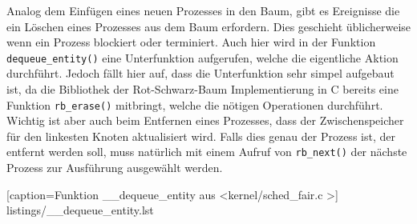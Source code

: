 Analog dem Einfügen eines neuen Prozesses in den Baum, gibt es Ereignisse die ein Löschen eines Prozesses aus dem Baum erfordern. Dies geschieht üblicherweise wenn ein Prozess blockiert oder terminiert. Auch hier wird in der Funktion \texttt{dequeue\_entity()} eine Unterfunktion aufgerufen, welche die eigentliche Aktion durchführt. Jedoch fällt hier auf, dass die Unterfunktion sehr simpel aufgebaut ist, da die Bibliothek der Rot-Schwarz-Baum Implementierung in C bereits eine Funktion \texttt{rb\_erase()} mitbringt, welche die nötigen Operationen durchführt. Wichtig ist aber auch beim Entfernen eines Prozesses, dass der Zwischenspeicher für den linkesten Knoten aktualisiert wird. Falls dies genau der Prozess ist, der entfernt werden soll, muss natürlich mit einem Aufruf von \texttt{rb\_next()} der nächste Prozess zur Ausführung ausgewählt werden. 

[caption={Funktion \_\_dequeue\_entity aus \textless kernel/sched\_fair.c \textgreater}]
{listings/__dequeue_entity.lst} 

